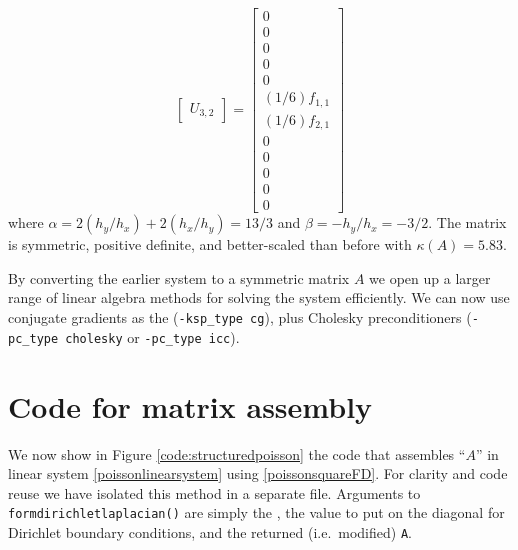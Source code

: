 \begin{example}
\begin{equation*}
\begin{bmatrix}
U_{3,2}
\end{bmatrix}
=
\begin{bmatrix}
0 \\
0 \\
0 \\
0 \\
0 \\
(1/6) f_{1,1} \\
(1/6) f_{2,1} \\
0 \\
0 \\
0 \\
0 \\
0
\end{bmatrix}
\end{equation*}
where $\alpha = 2 (h_y/h_x) + 2 (h_x/h_y) = 13/3$ and $\beta = - h_y/h_x = - 3/2$.  The matrix is symmetric, positive definite, and better-scaled than before with $\kappa(A)=5.83$.
\end{example}
\noindent\hrulefill

By converting the earlier system to a symmetric matrix $A$ we open up a larger range of linear algebra methods for solving the system efficiently.  We can now use conjugate gradients as the \pKSP (\texttt{-ksp\_type cg}), plus Cholesky preconditioners (\texttt{-pc\_type cholesky} or \texttt{-pc\_type icc}).


\section{Code for matrix assembly}

We now show in Figure \ref{code:structuredpoisson} the code that assembles ``$A$'' in linear system \eqref{poissonlinearsystem} using \eqref{poissonsquareFD}.  For clarity and code reuse we have isolated this method in a separate file.  Arguments to \texttt{formdirichletlaplacian()} are simply the \pDM, the value to put on the diagonal for Dirichlet boundary conditions, and the returned (i.e.~modified) \pMat \texttt{A}.


